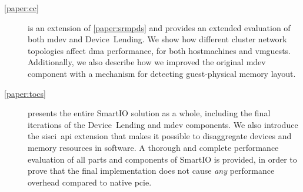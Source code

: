 \begin{description}
    \item[\cref{paper:cc}]
        is an extension of \cref{paper:srmpds} and provides an extended evaluation of both \gls{mdev} and Device~Lending.
        We show how different cluster network topologies affect \gls{dma} performance, for both \glspl{hostmachine} and \glspl{vmguest}.
        Additionally, we also describe how we improved the original \gls{mdev} component with a mechanism for detecting \gls{guest}-physical memory layout.

    \item[\cref{paper:tocs}]
        presents the entire SmartIO solution as a whole, including the final iterations of the Device~Lending and \gls{mdev} components.
        We also introduce the \gls{sisci}~\gls{api} extension that makes it possible to \gls{disaggregate} devices and memory resources in software.
        A thorough and complete performance evaluation of all parts and components of SmartIO is provided, in order to prove that the final implementation does not cause \emph{any} performance overhead compared to native \gls{pcie}.
\end{description}

